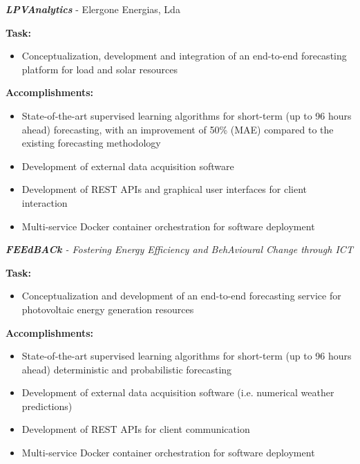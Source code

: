 \documentclass{mycv}
\begin{document}
\begin{myitemize}
	


	\item \textit{\textbf{LPVAnalytics}} - Elergone Energias, Lda
	
		\vspace{0.15cm}
		\textbf{Task:}
		
		\begin{itemize}[itemsep=1px]
			\item Conceptualization, development and integration of an end-to-end forecasting platform for load and solar resources
		\end{itemize}
		
		\vspace{0.15cm}
		\textbf{Accomplishments:}
		
		\begin{itemize}[itemsep=1px]
			\item State-of-the-art supervised learning algorithms for short-term (up to 96 hours ahead) forecasting, with an improvement of 50\% (MAE) compared to the existing forecasting methodology
			\item Development of external data acquisition software
			\item Development of REST APIs and graphical user interfaces for client interaction
			\item Multi-service Docker container orchestration for software deployment
		\end{itemize}

\pagebreak

	\item \textit{\textbf{FEEdBACk} - Fostering Energy Efficiency and BehAvioural Change through ICT}
	
		\vspace{0.15cm}
		\textbf{Task:}
		
		\begin{itemize}[itemsep=1px]
		\item Conceptualization and development of an end-to-end forecasting service for photovoltaic energy generation resources
		\end{itemize}
		
		\textbf{Accomplishments:}
		\begin{itemize}[itemsep=1px]
			\item State-of-the-art supervised learning algorithms for short-term (up to 96 hours ahead) deterministic and probabilistic forecasting
			\item Development of external data acquisition software (i.e. numerical weather predictions)
			\item Development of REST APIs for client communication
			\item Multi-service Docker container orchestration for software deployment
		\end{itemize}
		\vspace{0.2cm}
		

\end{myitemize}
\end{document}
